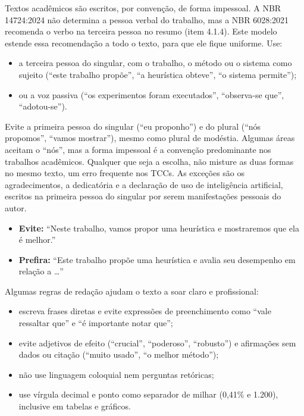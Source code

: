 \begin{instrucao}
Textos acadêmicos são escritos, por convenção, de forma impessoal. A NBR
14724:2024 não determina a pessoa verbal do trabalho, mas a NBR 6028:2021
recomenda o verbo na terceira pessoa no resumo (item 4.1.4). Este modelo
estende essa recomendação a todo o texto, para que ele fique uniforme. Use:
\begin{itemize}
  \item a terceira pessoa do singular, com o trabalho, o método ou o sistema
        como sujeito (``este trabalho propõe'', ``a heurística obteve'',
        ``o sistema permite'');
  \item ou a voz passiva (``os experimentos foram executados'', ``observa-se
        que'', ``adotou-se'').
\end{itemize}
Evite a primeira pessoa do singular (``eu proponho'') e do plural (``nós
propomos'', ``vamos mostrar''), mesmo como plural de modéstia. Algumas áreas
aceitam o ``nós'', mas a forma impessoal é a convenção predominante nos
trabalhos acadêmicos. Qualquer que seja a escolha, não misture as duas formas
no mesmo texto, um erro frequente nos TCCs. As exceções são
os agradecimentos, a dedicatória e a declaração de uso de inteligência
artificial, escritos na primeira pessoa do singular por serem manifestações
pessoais do autor.

\begin{itemize}
  \item \textbf{Evite:} ``Neste trabalho, vamos propor uma heurística e
        mostraremos que ela é melhor.''
  \item \textbf{Prefira:} ``Este trabalho propõe uma heurística e avalia seu
        desempenho em relação a \ldots''
\end{itemize}

Algumas regras de redação ajudam o texto a soar claro e profissional:
\begin{itemize}
  \item escreva frases diretas e evite expressões de preenchimento como ``vale
        ressaltar que'' e ``é importante notar que'';
  \item evite adjetivos de efeito (``crucial'', ``poderoso'', ``robusto'') e
        afirmações sem dados ou citação (``muito usado'', ``o melhor método'');
  \item não use linguagem coloquial nem perguntas retóricas;
  \item use vírgula decimal e ponto como separador de milhar (0,41\% e
        1.200), inclusive em tabelas e gráficos.
\end{itemize}
\end{instrucao}

